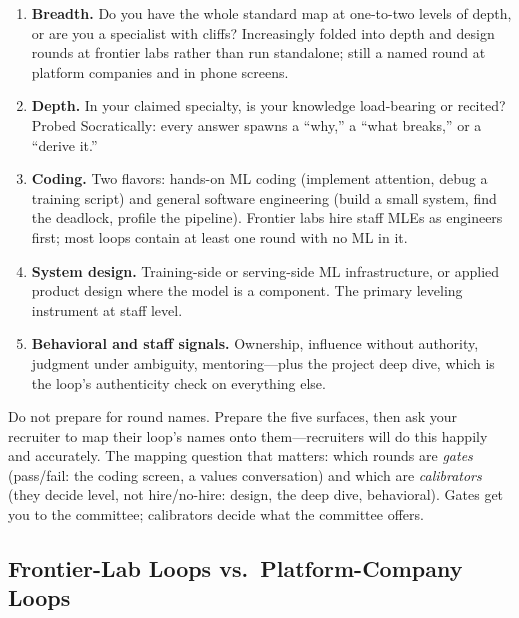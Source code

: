 \begin{enumerate}
    \item \textbf{Breadth.} Do you have the whole standard map at one-to-two levels of depth, or are you a specialist with cliffs? Increasingly folded into depth and design rounds at frontier labs rather than run standalone; still a named round at platform companies and in phone screens.
    \item \textbf{Depth.} In your claimed specialty, is your knowledge load-bearing or recited? Probed Socratically: every answer spawns a ``why,'' a ``what breaks,'' or a ``derive it.''
    \item \textbf{Coding.} Two flavors: hands-on ML coding (implement attention, debug a training script) and general software engineering (build a small system, find the deadlock, profile the pipeline). Frontier labs hire staff MLEs as engineers first; most loops contain at least one round with no ML in it.
    \item \textbf{System design.} Training-side or serving-side ML infrastructure, or applied product design where the model is a component. The primary leveling instrument at staff level.
    \item \textbf{Behavioral and staff signals.} Ownership, influence without authority, judgment under ambiguity, mentoring---plus the project deep dive, which is the loop's authenticity check on everything else.
\end{enumerate}

\begin{keyinsight}
Do not prepare for round names. Prepare the five surfaces, then ask your recruiter to map their loop's names onto them---recruiters will do this happily and accurately. The mapping question that matters: which rounds are \textit{gates} (pass/fail: the coding screen, a values conversation) and which are \textit{calibrators} (they decide level, not hire/no-hire: design, the deep dive, behavioral). Gates get you to the committee; calibrators decide what the committee offers.
\end{keyinsight}

\subsection{Frontier-Lab Loops vs.\ Platform-Company Loops}

